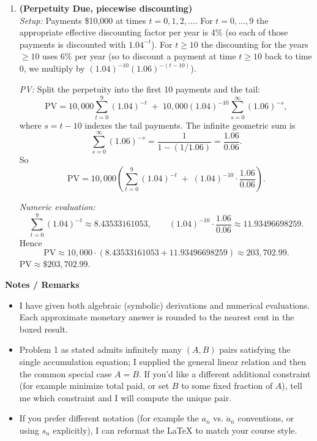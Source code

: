 \documentclass[11pt]{article}
\begin{document}
\begin{enumerate}[leftmargin=*,itemsep=16pt]
\bigskip

\item \textbf{(Perpetuity Due, piecewise discounting)}\\[4pt]
  \emph{Setup:} Payments \$10,000 at times \(t=0,1,2,\dots\). For \(t=0,\dots,9\) the appropriate effective discounting factor per year is 4\% (so each of those payments is discounted with \(1.04^{-t}\)). For \(t\ge 10\) the discounting for the years \(\ge 10\) uses 6\% per year (so to discount a payment at time \(t\ge 10\) back to time 0, we multiply by \((1.04)^{-10}(1.06)^{-(t-10)}\)).

  \emph{PV:} Split the perpetuity into the first 10 payments and the tail:
  \[
    \text{PV} = 10{,}000\sum_{t=0}^{9}(1.04)^{-t}
      \;+\;10{,}000(1.04)^{-10}\sum_{s=0}^{\infty}(1.06)^{-s},
  \]
  where \(s=t-10\) indexes the tail payments. The infinite geometric sum is
  \[
    \sum_{s=0}^{\infty}(1.06)^{-s} = \frac{1}{1-(1/1.06)} = \frac{1.06}{0.06}.
  \]
  So
  \[
    \text{PV} = 10{,}000\left(\sum_{t=0}^{9}(1.04)^{-t} \;+\; (1.04)^{-10}\cdot\frac{1.06}{0.06}\right).
  \]

  \emph{Numeric evaluation:}
  \[
    \sum_{t=0}^{9}(1.04)^{-t}\approx 8.43533161053,\qquad
    (1.04)^{-10}\cdot\frac{1.06}{0.06}\approx 11.93496698259.
  \]
  Hence
  \[
    \text{PV}\approx 10{,}000\cdot(8.43533161053 + 11.93496698259)
      \approx 203{,}702.99.
  \]
  \(\boxed{\text{PV}\approx \$203{,}702.99.}\)

\end{enumerate}

\bigskip
\noindent\textbf{Notes / Remarks}
\begin{itemize}
  \item I have given both algebraic (symbolic) derivations and numerical evaluations. Each approximate monetary answer is rounded to the nearest cent in the boxed result.
  \item Problem 1 as stated admits infinitely many \((A,B)\) pairs satisfying the single accumulation equation; I supplied the general linear relation and then the common special case \(A=B\). If you'd like a different additional constraint (for example minimize total paid, or set \(B\) to some fixed fraction of \(A\)), tell me which constraint and I will compute the unique pair.
  \item If you prefer different notation (for example the \(a_{\overline{n}}\) vs. \(\ddot a_{\overline{n}}\) conventions, or using \(s_n\) explicitly), I can reformat the LaTeX to match your course style.
\end{itemize}
\end{document}
